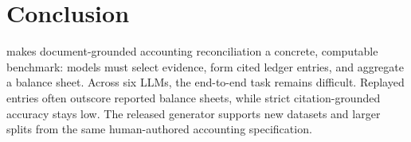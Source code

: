 \section{Conclusion}
\label{sec:conclusion}

\benchmark{} makes document-grounded accounting reconciliation a concrete, computable benchmark: models must select evidence, form cited ledger entries, and aggregate a balance sheet. Across six LLMs, the end-to-end task remains difficult. Replayed entries often outscore reported balance sheets, while strict citation-grounded accuracy stays low. The released generator supports new datasets and larger splits from the same human-authored accounting specification.
